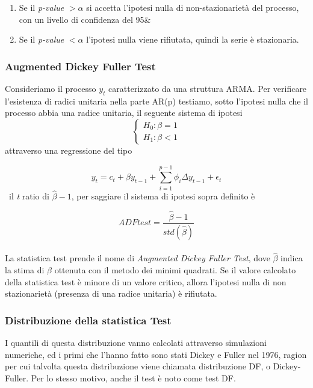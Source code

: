 \documentclass[]{article}
\begin{document}
\begin{enumerate}
	\item Se il \textit{p-value} $> \alpha$ si accetta l'ipotesi nulla di non-stazionarietà del processo, con un livello di confidenza del 95\&%
	\item Se il \textit{p-value} $< \alpha$ l'ipotesi nulla viene rifiutata, quindi la serie è stazionaria.
\end{enumerate}


\subsubsection*{Augmented Dickey Fuller Test}

Consideriamo il processo $y_t$ caratterizzato da una struttura ARMA. Per verificare l'esistenza di radici unitaria nella parte AR(p) testiamo, sotto l'ipotesi nulla che il processo abbia una radice unitaria, il seguente sistema di ipotesi
\begin{equation}
	\begin{cases}
		H_0 : \beta = 1 \\
		H_1 : \beta < 1
	\end{cases}
\end{equation}
attraverso una regressione del tipo

\begin{equation}
	y_t = c_t + \beta y_{t-1}+ \sum_{i=1}^{p-1} \phi_i \Delta y_{t-1} + \epsilon_t
\end{equation}
\
il \textit{t} ratio di $\hat{\beta} - 1$, per saggiare il sistema di ipotesi sopra definito è

\begin{equation}
	ADFtest = \frac{\hat{\beta}-1}{std(\hat{\beta})}
\end{equation}
\
\\
La statistica test prende il nome di  \textit{Augmented Dickey Fuller Test}, dove $\hat{\beta}$ indica la stima di $\beta$ ottenuta con il metodo dei minimi quadrati.
Se il valore calcolato della statistica test è minore di un valore critico, allora l'ipotesi nulla di non stazionarietà (presenza di una radice unitaria) è rifiutata.

\subsubsection*{Distribuzione della statistica Test}

I quantili di questa distribuzione vanno calcolati attraverso
simulazioni numeriche, ed i primi che l’hanno fatto sono stati Dickey e Fuller
nel 1976, ragion per cui talvolta questa distribuzione viene chiamata distribuzione DF, o Dickey-Fuller. Per lo stesso motivo, anche il test è noto come test
DF. 
\end{document}
